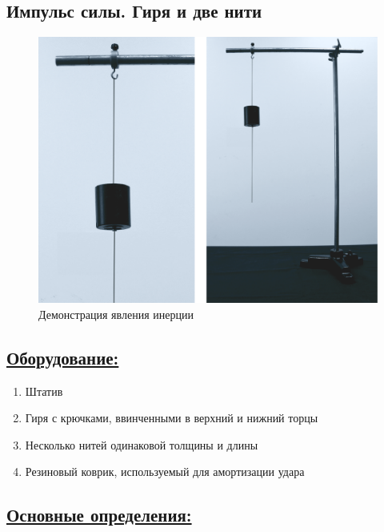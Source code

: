 \documentclass[14pt,a4paper,oneside]{extarticle}	%
\begin{document}

\begin{center}
	\subsection*{Импульс силы. Гиря и две нити}
\end{center}

\begin{figure}[H] 	%
	\centering 		%
	\includegraphics[width=0.9\linewidth]{inertia-2.png}
	\caption{Демонстрация явления инерции}
\end{figure}

\subsection*{\underline{Оборудование:}}

\begin{enumerate}
	\item Штатив
	\item Гиря с крючками, ввинченными в верхний и нижний торцы
	\item Несколько нитей одинаковой толщины и длины
	\item Резиновый коврик, используемый для амортизации удара
\end{enumerate}

\newpage
\subsection*{\underline{Основные определения:}}
\end{document}
